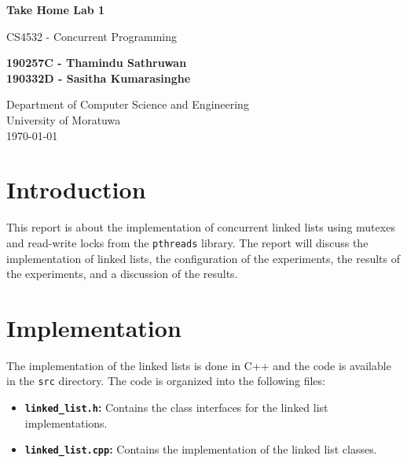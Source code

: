 \documentclass[a4paper,12pt]{article}
\begin{document}
\begin{titlepage}
    \begin{center}
        \vspace*{1cm}

        \LARGE
        \textbf{Take Home Lab 1}

        \vspace{0.5cm}

        \large
        CS4532 - Concurrent Programming

        \vspace{1.5cm}

        \textbf{190257C - Thamindu Sathruwan\\190332D - Sasitha Kumarasinghe}

        \vfill

        \normalsize
        Department of Computer Science and Engineering\\
        University of Moratuwa\\
        \today

    \end{center}
\end{titlepage}

\tableofcontents
\newpage

\section{Introduction}

This report is about the implementation of concurrent linked lists using mutexes and read-write locks from the \lstinline|pthreads| library. The report will discuss the implementation of linked lists, the configuration of the experiments, the results of the experiments, and a discussion of the results.

\section{Implementation}

The implementation of the linked lists is done in C++ and the code is available in the \lstinline|src| directory. The code is organized into the following files:

\begin{itemize}
    \item \textbf{\lstinline|linked_list.h|:} Contains the class interfaces for the linked list implementations.
    \item \textbf{\lstinline|linked_list.cpp|:} Contains the implementation of the linked list classes.
\end{itemize}
\end{document}
